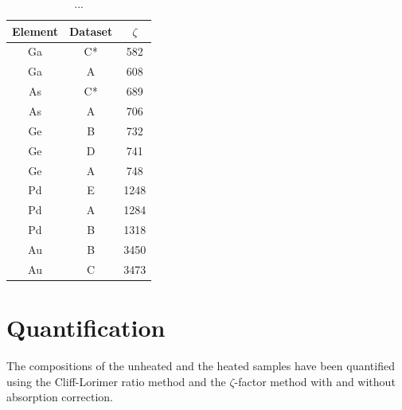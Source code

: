 \begin{table}
	\caption{...}
	\begin{center}
	\begin{tabular}{ccc}

	Element & Dataset & $\zeta$\\ 
	\midrule
	\hline
	Ga & C* & 582\\
	Ga & A  & 608\\
	As & C* & 689\\
	As & A  & 706\\
	Ge & B  & 732\\
	Ge & D  & 741\\
	Ge & A  & 748\\
	Pd & E  & 1248\\
	Pd & A  & 1284\\
	Pd & B  & 1318\\
	Au & B  & 3450\\ 
	Au & C  & 3473\\
	\hline
	\end{tabular} 
	\end{center}
	\label{tab:non-heated zeta-values}
\end{table}

\section{Quantification}

The compositions of the unheated and the heated samples have been quantified using the Cliff-Lorimer ratio method and the $\zeta$-factor method with and without absorption correction. 